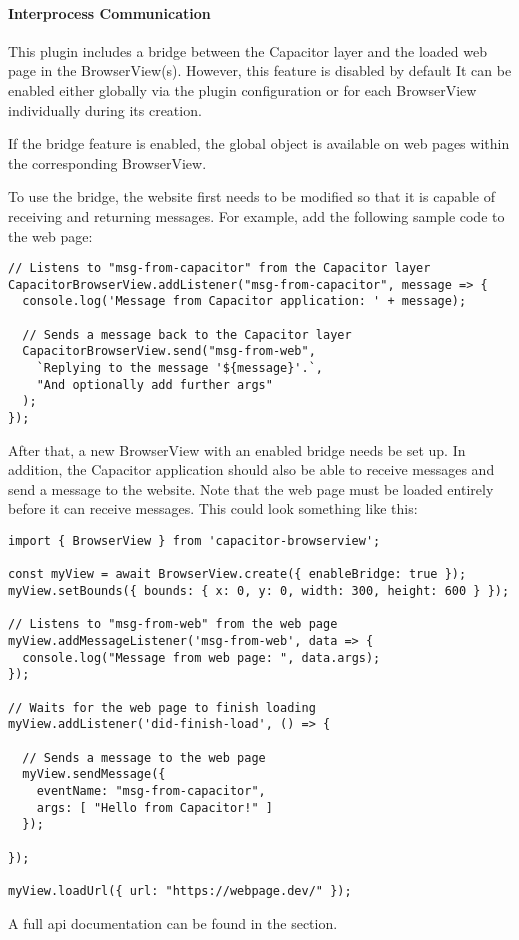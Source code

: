 \newpage

\paragraph{Interprocess Communication}
\label{sec:Capacitor-BrowserView:InterprocessCommunication}

This plugin includes a bridge between the Capacitor layer and the loaded web page in the BrowserView(s).
However, this feature is disabled by default
It can be enabled either globally via the plugin configuration or for each BrowserView individually during its creation.

If the bridge feature is enabled, the global object  is available on web pages within the corresponding BrowserView.

To use the bridge, the website first needs to be modified so that it is capable of receiving and returning messages.
For example, add the following sample code to the web page:

\begin{verbatim}
// Listens to "msg-from-capacitor" from the Capacitor layer
CapacitorBrowserView.addListener("msg-from-capacitor", message => {
  console.log('Message from Capacitor application: ' + message);

  // Sends a message back to the Capacitor layer
  CapacitorBrowserView.send("msg-from-web",
    `Replying to the message '${message}'.`,
    "And optionally add further args"
  );
});
\end{verbatim}

After that, a new BrowserView with an enabled bridge needs be set up.
In addition, the Capacitor application should also be able to receive messages and send a message to the website.
Note that the web page must be loaded entirely before it can receive messages.
This could look something like this:

\begin{verbatim}
import { BrowserView } from 'capacitor-browserview';

const myView = await BrowserView.create({ enableBridge: true });
myView.setBounds({ bounds: { x: 0, y: 0, width: 300, height: 600 } });

// Listens to "msg-from-web" from the web page
myView.addMessageListener('msg-from-web', data => {
  console.log("Message from web page: ", data.args);
});

// Waits for the web page to finish loading
myView.addListener('did-finish-load', () => {

  // Sends a message to the web page
  myView.sendMessage({
    eventName: "msg-from-capacitor",
    args: [ "Hello from Capacitor!" ]
  });

});

myView.loadUrl({ url: "https://webpage.dev/" });
\end{verbatim}

A full \ac{api} documentation can be found in the  section.
